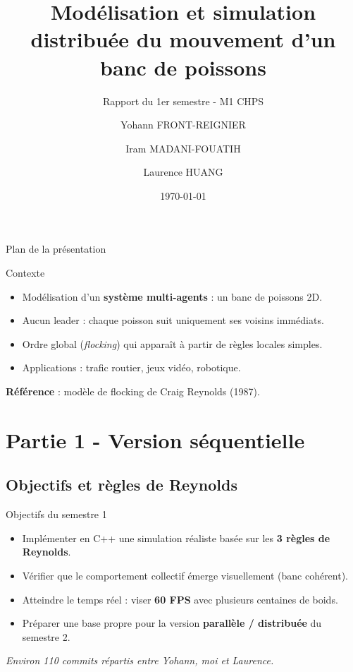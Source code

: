 \documentclass[aspectratio=169]{beamer}
\title{Modélisation et simulation distribuée du mouvement d'un banc de poissons}
\subtitle{Rapport du 1er semestre - M1 CHPS}
\author{Yohann FRONT-REIGNIER \and Iram MADANI-FOUATIH \and Laurence HUANG}
\institute{Encadrant : Soufian BEN AMOR}
\date{\today}
\begin{document}
\begin{frame}
\titlepage
\end{frame}

\begin{frame}{Plan de la présentation}
    \tableofcontents
\end{frame}

\begin{frame}{Contexte}
  \begin{itemize}
    \item Modélisation d'un \textbf{système multi-agents} : un banc de poissons 2D.
    \item Aucun leader : chaque poisson suit uniquement ses voisins immédiats.
    \item Ordre global (\emph{flocking}) qui apparaît à partir de règles locales simples.
    \item Applications : trafic routier, jeux vidéo, robotique.
  \end{itemize}
  \vspace{0.4cm}
  \textbf{Référence} : modèle de flocking de Craig Reynolds (1987).
\end{frame}

\section{Partie 1 - Version séquentielle}


\subsection{Objectifs et règles de Reynolds}

\begin{frame}{Objectifs du semestre 1}
  \begin{itemize}
    \item Implémenter en C++ une simulation réaliste basée sur les \textbf{3 règles de Reynolds}.
    \item Vérifier que le comportement collectif émerge visuellement (banc cohérent).
    \item Atteindre le temps réel : viser \textbf{60 FPS} avec plusieurs centaines de boids.
    \item Préparer une base propre pour la version \textbf{parallèle / distribuée} du semestre 2.
  \end{itemize}
  \vspace{0.4cm}
  \textit{Environ 110 commits répartis entre Yohann, moi et Laurence.}
\end{frame}
\end{document}
